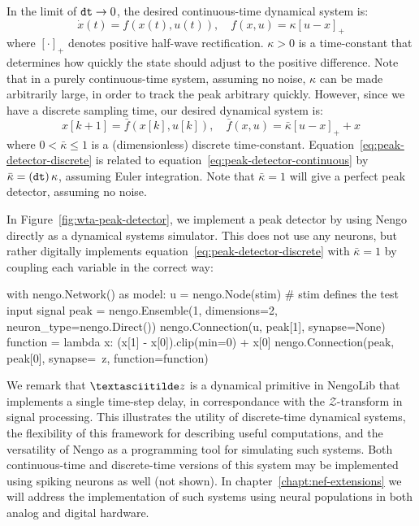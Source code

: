 
In the limit of $\texttt{dt}{} \rightarrow 0$, the desired continuous-time dynamical system is:
\begin{equation}
\label{eq:peak-detector-continuous}
\dot{x}(t) = f(x(t), u(t)), \quad f(x, u) = \kappa \left[u - x \right]_+
\end{equation}
where $\left[ \cdot \right]_+$ denotes positive half-wave rectification. $\kappa > 0$ is a time-constant that determines how quickly the state should adjust to the positive difference. Note that in a purely continuous-time system, assuming no noise, $\kappa$ can be made arbitrarily large, in order to track the peak arbitrary quickly. 
However, since we have a discrete sampling time, our desired dynamical system is:
\begin{equation}
\label{eq:peak-detector-discrete}
x[k + 1] = \bar{f}(x[k], u[k]), \quad \bar{f}(x, u) = \bar{\kappa} \left[u - x \right]_+ + x
\end{equation}
where $0 < \bar{\kappa} \le 1$ is a (dimensionless) discrete time-constant.
Equation~\ref{eq:peak-detector-discrete} is related to equation~\ref{eq:peak-detector-continuous} by $\bar{\kappa} = \left( \texttt{dt}{} \right) \kappa$, assuming Euler integration.
Note that $\bar{\kappa} = 1$ will give a perfect peak detector, assuming no noise.

In Figure~\ref{fig:wta-peak-detector}, we implement a peak detector by using Nengo directly as a dynamical systems simulator. This does not use any neurons, but rather digitally implements equation~\ref{eq:peak-detector-discrete} with $\bar{\kappa} = 1$ by coupling each variable in the correct way:
\begin{python}
with nengo.Network() as model:
    u = nengo.Node(stim)  # stim defines the test input signal
    peak = nengo.Ensemble(1, dimensions=2, neuron_type=nengo.Direct())
    nengo.Connection(u, peak[1], synapse=None)
    function = lambda x: (x[1] - x[0]).clip(min=0) + x[0]
    nengo.Connection(peak, peak[0], synapse=~z, function=function)
\end{python}
We remark that $\textasciitilde z$ is a dynamical primitive in NengoLib that implements a single time-step delay, in correspondance with the $\mathcal{Z}$-transform in signal processing.
This illustrates the utility of discrete-time dynamical systems, the flexibility of this framework for describing useful computations, and the versatility of Nengo as a programming tool for simulating such systems.
Both continuous-time and discrete-time versions of this system may be implemented using spiking neurons as well (not shown).
In chapter~\ref{chapt:nef-extensions} we will address the implementation of such systems using neural populations in both analog and digital hardware.

